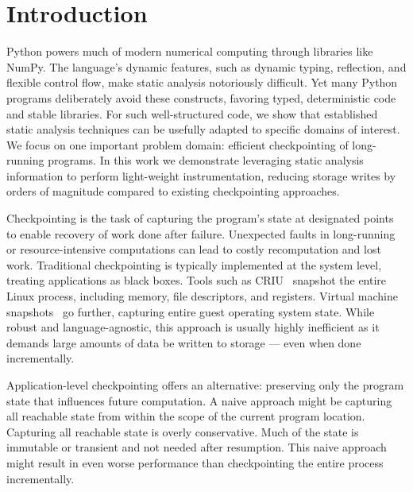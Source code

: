 \section{Introduction}
Python powers much of modern numerical computing through libraries like NumPy. The language’s dynamic features, such as dynamic typing, reflection, and flexible control flow, make static analysis notoriously difficult. Yet many Python programs deliberately avoid these constructs, favoring typed, deterministic code and stable libraries. For such well-structured code, we show that established static analysis techniques can be usefully adapted to specific domains of interest. We focus on one important problem domain: efficient checkpointing of long-running programs. 
In this work we demonstrate leveraging static analysis information to perform light-weight instrumentation, reducing storage writes by orders of magnitude compared to existing checkpointing approaches.

Checkpointing is the task of capturing the program’s state at designated points to enable recovery of work done after failure. Unexpected faults in long-running or resource-intensive computations can lead to costly recomputation and lost work. Traditional checkpointing is typically implemented at the system level, treating applications as black boxes. Tools such as CRIU~\cite{CRIUProject} snapshot the entire Linux process, including memory, file descriptors, and registers. Virtual machine snapshots~\cite{VMwareSnapshot, RedHatVMSnapshot} go further, capturing entire guest operating system state. While robust and language-agnostic, this approach is usually highly inefficient as it demands large amounts of data be written to storage --- even when done incrementally.

Application-level checkpointing offers an alternative: preserving only the program state that influences future computation. A naive approach might be capturing all reachable state from within the scope of the current program location. Capturing all reachable state is overly conservative. Much of the state is immutable or transient and not needed after resumption.  This naive approach might result in even worse performance than checkpointing the entire process incrementally.


